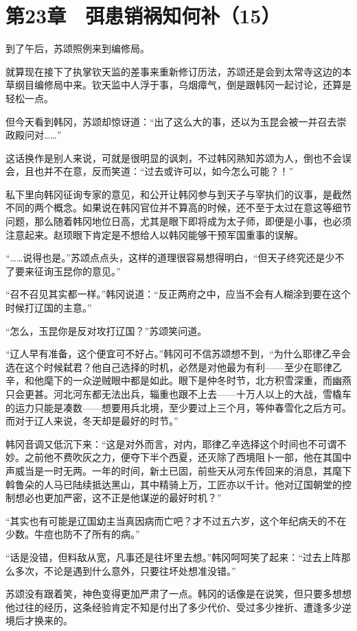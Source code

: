 \section{第23章　弭患销祸知何补（15）}

到了午后，苏颂照例来到编修局。

就算现在接下了执掌钦天监的差事来重新修订历法，苏颂还是会到太常寺这边的本草纲目编修局中来。钦天监中人浮于事，乌烟瘴气，倒是跟韩冈一起讨论，还算是轻松一点。

但今天看到韩冈，苏颂却惊讶道：“出了这么大的事，还以为玉昆会被一并召去崇政殿问对……”

这话换作是别人来说，可就是很明显的讽刺，不过韩冈熟知苏颂为人，倒也不会误会，且也并不在意，反而笑道：“过去或许可以，如今怎么可能？！”

私下里向韩冈征询专家的意见，和公开让韩冈参与到天子与宰执们的议事，是截然不同的两个概念。如果说在韩冈官位并不算高的时候，还不至于太过在意这等细节问题，那么随着韩冈地位日高，尤其是眼下即将成为太子师，即便是小事，也必须注意起来。赵顼眼下肯定是不想给人以韩冈能够干预军国重事的误解。

“……说得也是。”苏颂点点头，这样的道理很容易想得明白，“但天子终究还是少不了要来征询玉昆你的意见。”

“召不召见其实都一样。”韩冈说道：“反正两府之中，应当不会有人糊涂到要在这个时候打辽国的主意。”

“怎么，玉昆你是反对攻打辽国？”苏颂笑问道。

“辽人早有准备，这个便宜可不好占。”韩冈可不信苏颂想不到，“为什么耶律乙辛会选在这个时候弑君？他自己选择的时机，必然是对他最为有利——至少在耶律乙辛，和他麾下的一众逆贼眼中都是如此。眼下是仲冬时节，北方积雪深重，而幽燕只会更甚。河北河东都无法出兵，辎重也跟不上去——十万人以上的大战，雪橇车的运力只能是凑数——想要用兵北境，至少要过上三个月，等仲春雪化之后方可。而对于辽人来说，冬天却是最好的时节。”

韩冈音调又低沉下来：“这是对外而言，对内，耶律乙辛选择这个时间也不可谓不妙。之前他不费吹灰之力，便夺下半个西夏，还灭除了西境阻卜一部，他在其国中声威当是一时无两。一年的时间，新土已固，前些天从河东传回来的消息，其麾下斡鲁朵的人马已陆续抵达黑山，其中精骑上万，工匠亦以千计。他对辽国朝堂的控制想必也更加严密，这不正是他谋逆的最好时机？”

“其实也有可能是辽国幼主当真因病而亡吧？才不过五六岁，这个年纪病夭的不在少数。牛痘也防不了所有的病。”

“话是没错，但料敌从宽，凡事还是往坏里去想。”韩冈呵呵笑了起来：“过去上阵那么多次，不论是遇到什么意外，只要往坏处想准没错。”

苏颂没有跟着笑，神色变得更加严肃了一点。韩冈的话像是在说笑，但只要多想想他过往的经历，这条经验肯定不知是付出了多少代价、受过多少挫折、遭逢多少逆境后才换来的。

